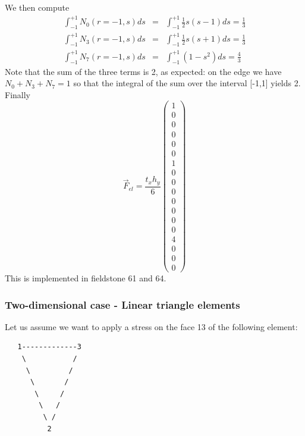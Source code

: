 We then compute
\begin{eqnarray}
\int_{-1}^{+1} N_0(r=-1,s) ds 
&=& \int_{-1}^{+1} \frac{1}{2}s(s-1) ds = \frac{1}{3} \\
\int_{-1}^{+1} N_3(r=-1,s) ds 
&=& \int_{-1}^{+1} \frac{1}{2}s(s+1) ds = \frac{1}{3} \\
\int_{-1}^{+1} N_7(r=-1,s) ds 
&=& \int_{-1}^{+1} (1-s^2) ds = \frac{4}{3} 
\end{eqnarray}
Note that the sum of the three terms is 2, as expected: on the edge
we have $N_0+N_3+N_7 =1$ so that the integral of the sum over the 
interval [-1,1] yields 2. Finally 
\[
\vec{F}_{el}
=
\frac{t_x  h_y}{6}
\left(
\begin{array}{c}
1 \\
0 \\
0 \\
0 \\
0 \\
0 \\
1 \\
0 \\
0 \\
0 \\
0 \\
0 \\
0 \\
0 \\
4 \\
0 \\
0 \\
0
\end{array}
\right)
\]
This is implemented in fieldstone 61 and 64.








\subsubsection{Two-dimensional case - Linear triangle elements}

Let us assume we want to apply a stress on the face 13 of the following element:
\begin{verbatim}
   1-------------3
    \           /
     \         /
      \       /
       \     /
        \   /
         \ /
          2
\end{verbatim}

